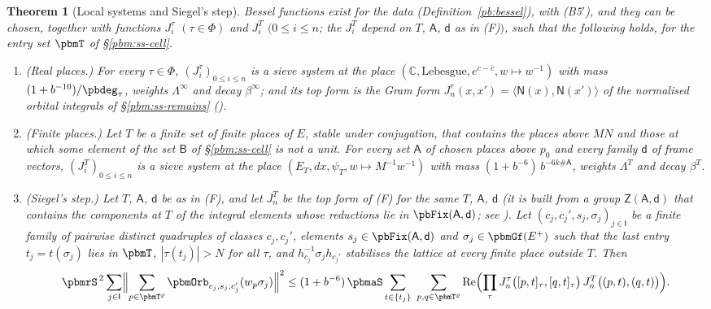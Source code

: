 \documentclass[10pt]{amsart}
\newtheorem{theorem}{Theorem}[section]
\theoremstyle{definition}
\theoremstyle{remark}
\newcommand{\C}{\mathbb C}
\newcommand{\Rel}{\operatorname{Re}}
\providecommand{\auPl}{\Phi}
\providecommand{\aubar}[1]{\overline{#1}}
\begin{document}
\begin{theorem}[Local systems and Siegel's step]\label{pbm:inputs}
Bessel functions exist for the data (Definition~\ref{pb:bessel}), with \textup{(B5$'$)}, and they
can be chosen, together with functions $J^\tau_i$ $(\tau\in\auPl)$ and $J^T_i$ $(0\le i\le n$; the
$J^T_i$ depend on $T$, $\mathsf A$, $\mathsf d$ as in \textup{(F)}$)$, such that the following
holds, for the entry set $\pbmT$ of \S\ref{pbm:ss-cell}.
\begin{enumerate}
\item[(R)] \emph{(Real places.)} For every $\tau\in\auPl$, $(J^\tau_i)_{0\le i
\le n}$ is a sieve system at the place $(\C,\text{Lebesgue},e^{c-\aubar c},w\mapsto w^{-1})$ with mass $(1+b^{-10})/
\pbdeg_\tau$, weights $\Lambda^\infty$ and decay $\beta^\infty$; and its top form is the Gram form
$J^\tau_n(x,x')=\langle\mathsf N(x),\mathsf N(x')\rangle$ of the normalised orbital integrals of
\S\ref{pbm:ss-remains} ({\cite[Theorem~2.17\,(R-b)]{P52}}).
\item[(F)] \emph{(Finite places.)} Let $T$ be a finite set of finite places of $E$, stable under
conjugation, that contains the places above $MN$ and those at which some element of the set
$\mathsf B$ of \S\ref{pbm:ss-cell} is not a unit. For every set $\mathsf A$ of chosen places above
$p_0$ and every family $\mathsf d$ of frame vectors, $(J^{T}_i)_{0\le i\le
n}$ is a sieve system at the place $(E_T,dx,\psi_T,w\mapsto M^{-1}w^{-1})$ with mass $(1+b^{-6})\,b^{-6k\#\mathsf A}$,
weights $\Lambda^T$ and decay $\beta^T$.
\item[(S)] \emph{(Siegel's step.)} Let $T$, $\mathsf A$, $\mathsf d$ be as in \textup{(F)}, and let $J^T_n$
be the top form of \textup{(F)} for the same $T$, $\mathsf A$, $\mathsf d$ (it is built from a group
$\mathsf Z(\mathsf A,\mathsf d)$ that contains the components at $T$ of the integral elements whose
reductions lie in $\pbFix(\mathsf A,\mathsf d)$; see {\cite[Theorem~5.28]{P52}}). Let
$(c_j,c_j',s_j,\sigma_j)_{j\in\mathsf I}$ be a finite family of pairwise distinct quadruples of
classes $c_j,c_j'$, elements $s_j\in\pbFix(\mathsf A,\mathsf d)$ and $\sigma_j\in\pbmGf(E^+)$ such
that the last entry $t_j=t(\sigma_j)$ lies in $\pbmT$, $|\tau(t_j)|>N$ for all $\tau$, and
$h_{c_j}^{-1}\sigma_jh_{c_j'}$ stabilises the lattice at every finite place outside $T$. Then
\[
\pbmrS^{\,2}\sum_{j\in\mathsf I}\Bigl\|\sum_{p\in\pbmT^\varrho}\pbmOrb_{c_j,s_j,c_j'}(w_p\sigma_j)\Bigr\|^2\le
(1+b^{-6})\,\pbmaS\sum_{t\in\{t_j\}}\ \sum_{p,q\in\pbmT^\varrho}\Rel\Bigl(\prod_\tau J^\tau_n\bigl([p,t]_\tau,
[q,t]_\tau\bigr)\,J^T_n\bigl((p,t),(q,t)\bigr)\Bigr).
\]
\end{enumerate}
\end{theorem}
\end{document}
